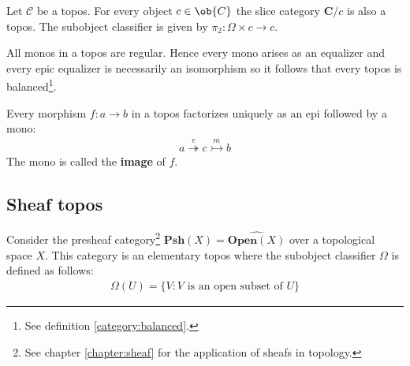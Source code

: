 	\begin{property}
		Let $\mathcal{C}$ be a topos. For every object $c\in\ob{C}$ the slice category $\mathbf{C}/c$ is also a topos. The subobject classifier is given by $\pi_2:\Omega\times c\rightarrow c$.
	\end{property}
	
	\begin{property}[Balanced]
		All monos in a topos are regular. Hence every mono arises as an equalizer and every epic equalizer is necessarily an isomorphism so it follows that every topos is balanced\footnote{See definition \ref{category:balanced}.}.
	\end{property}
	
	\begin{property}
		Every morphism $f:a\rightarrow b$ in a topos factorizes uniquely as an epi followed by a mono:
		\begin{gather}
			a\overset{e}{\twoheadrightarrow} c\overset{m}{\rightarrowtail} b
		\end{gather}
		The mono is called the \textbf{image} of $f$.
	\end{property}

\subsection{Sheaf topos}

	\begin{property}\label{topoi:sheaf_topos}
		Consider the presheaf category\footnote{See chapter \ref{chapter:sheaf} for the application of sheafs in topology.} $\textbf{Psh}(X) = \widehat{\textbf{Open}(X)}$ over a topological space $X$. This category is an elementary topos where the subobject classifier $\Omega$ is defined as follows:
		\begin{gather}
			\Omega(U) = \{V:V\text{ is an open subset of }U\}
		\end{gather}
	\end{property}
	
